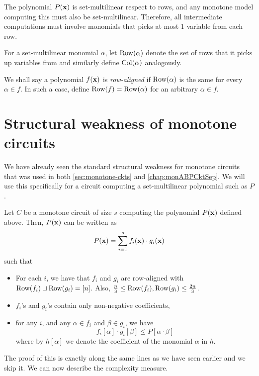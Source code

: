 The polynomial $P(\mathbf{x})$ is set-multilinear respect to rows, and any monotone model computing this must also be set-multilinear. Therefore, all intermediate computations must involve monomials that picks at most $1$ variable from each row.

For a set-multilinear monomial $\alpha$, let $\operatorname{Row}(\alpha)$ denote the set of rows that it picks up variables from and similarly define $\operatorname{Col}(\alpha)$ analogously.

We shall say a polynomial $f(\mathbf{x})$ is \emph{row-aligned} if $\operatorname{Row}(\alpha)$ is the same for every $\alpha \in f$. In such a case, define $\operatorname{Row}(f) = \operatorname{Row}(\alpha)$ for an arbitrary $\alpha \in f$. \\


\section{Structural weakness of monotone circuits}

We have already seen the standard structural weakness for monotone circuits that was used in both \autoref{sec:monotone-ckts} and \autoref{chap:monABPCktSep}. We will use this specifically for a circuit computing a set-multilinear polynomial such as $P$. 

\begin{lemma}\label{lem:monVPVNP:structure}
  Let $C$ be a monotone circuit of size $s$ computing the polynomial $P(\mathbf{x})$ defined above. Then, $P(\mathbf{x})$ can be written as
  \begin{equation}\label{eqn:monVPVNP-main}
    P(\mathbf{x}) = \sum_{i=1}^s f_i(\mathbf{x}) \cdot g_i(\mathbf{x})
  \end{equation}
  such that
  \begin{itemize}\itemsep 0pt
  \item For each $i$, we have that $f_i$ and $g_i$ are row-aligned with
    $\operatorname{Row}(f_i) \sqcup \operatorname{Row}(g_i) = [n]$. Also, $\frac{n}{3} \leq \operatorname{Row}(f_i), \operatorname{Row}(g_i) \leq \frac{2n}{3}$. 
  \item $f_i$'s and $g_i$'s contain only non-negative coefficients,
  \item for any $i$, and any $\alpha \in f_i$ and $\beta\in g_i$, we have
    \[
      f_i[\alpha]\cdot g_i[\beta] \leq P[\alpha \cdot \beta]
    \]
    where by $h[\alpha]$ we denote the coefficient of the monomial $\alpha$ in $h$.
  \end{itemize}
\end{lemma}

\noindent
The proof of this is exactly along the same lines as we have seen earlier and we skip it. We can now describe the complexity measure.

